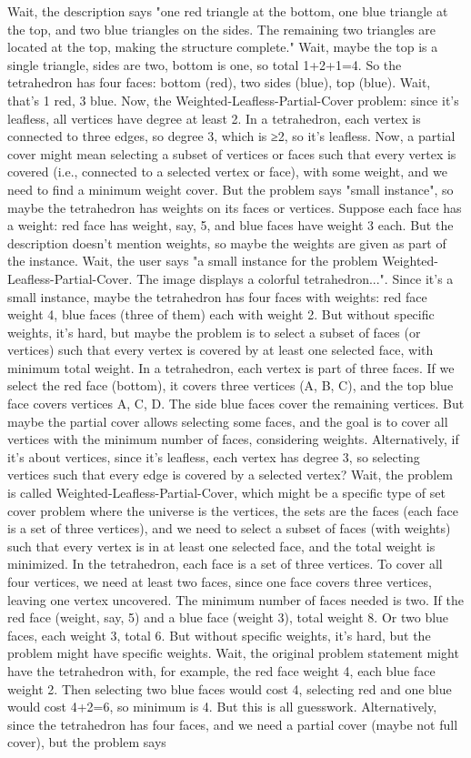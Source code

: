 Wait, the description says "one red triangle at the bottom, one blue triangle at the top, and two blue triangles on the sides. The remaining two triangles are located at the top, making the structure complete." Wait, maybe the top is a single triangle, sides are two, bottom is one, so total 1+2+1=4. So the tetrahedron has four faces: bottom (red), two sides (blue), top (blue). Wait, that's 1 red, 3 blue. Now, the Weighted-Leafless-Partial-Cover problem: since it's leafless, all vertices have degree at least 2. In a tetrahedron, each vertex is connected to three edges, so degree 3, which is ≥2, so it's leafless. Now, a partial cover might mean selecting a subset of vertices or faces such that every vertex is covered (i.e., connected to a selected vertex or face), with some weight, and we need to find a minimum weight cover. But the problem says "small instance", so maybe the tetrahedron has weights on its faces or vertices. Suppose each face has a weight: red face has weight, say, 5, and blue faces have weight 3 each. But the description doesn't mention weights, so maybe the weights are given as part of the instance. Wait, the user says "a small instance for the problem Weighted-Leafless-Partial-Cover. The image displays a colorful tetrahedron...". Since it's a small instance, maybe the tetrahedron has four faces with weights: red face weight 4, blue faces (three of them) each with weight 2. But without specific weights, it's hard, but maybe the problem is to select a subset of faces (or vertices) such that every vertex is covered by at least one selected face, with minimum total weight. In a tetrahedron, each vertex is part of three faces. If we select the red face (bottom), it covers three vertices (A, B, C), and the top blue face covers vertices A, C, D. The side blue faces cover the remaining vertices. But maybe the partial cover allows selecting some faces, and the goal is to cover all vertices with the minimum number of faces, considering weights. Alternatively, if it's about vertices, since it's leafless, each vertex has degree 3, so selecting vertices such that every edge is covered by a selected vertex? Wait, the problem is called Weighted-Leafless-Partial-Cover, which might be a specific type of set cover problem where the universe is the vertices, the sets are the faces (each face is a set of three vertices), and we need to select a subset of faces (with weights) such that every vertex is in at least one selected face, and the total weight is minimized. In the tetrahedron, each face is a set of three vertices. To cover all four vertices, we need at least two faces, since one face covers three vertices, leaving one vertex uncovered. The minimum number of faces needed is two. If the red face (weight, say, 5) and a blue face (weight 3), total weight 8. Or two blue faces, each weight 3, total 6. But without specific weights, it's hard, but the problem might have specific weights. Wait, the original problem statement might have the tetrahedron with, for example, the red face weight 4, each blue face weight 2. Then selecting two blue faces would cost 4, selecting red and one blue would cost 4+2=6, so minimum is 4. But this is all guesswork. Alternatively, since the tetrahedron has four faces, and we need a partial cover (maybe not full cover), but the problem says 